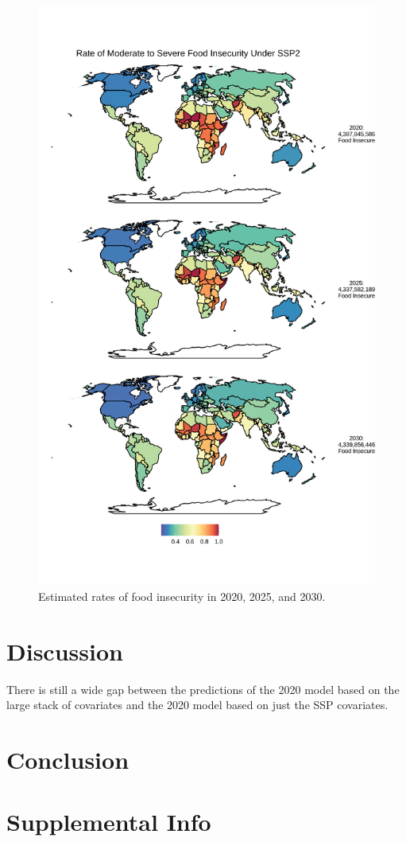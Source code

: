 \documentclass{article}
\begin{document}
\begin{figure}[H]
	\centering
	\includegraphics[width=\linewidth]{../figures/SSP2_LASSO.png}
	\caption{Estimated rates of food insecurity in 2020, 2025, and 2030.}
	\label{fig:ssp_map}
\end{figure}

\section{Discussion}
There is still a wide gap between the predictions of the 2020 model based on the large stack of covariates and the 2020 model based on just the SSP covariates.

\section{Conclusion}

\clearpage





\section*{Supplemental Info}
\end{document}
